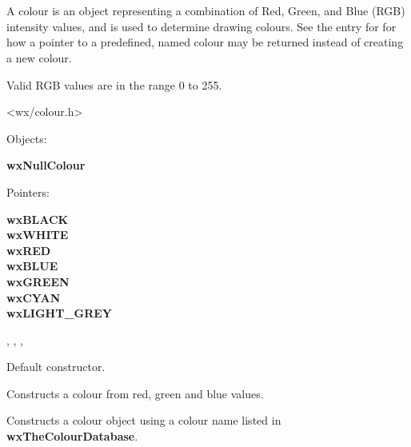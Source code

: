 \section{}\label{wxcolour}

A colour is an object representing a combination of Red, Green, and Blue (RGB) intensity values,
and is used to determine drawing colours. See the
entry for  for how a pointer to a predefined,
named colour may be returned instead of creating a new colour.

Valid RGB values are in the range 0 to 255.




<wx/colour.h>


Objects:

{\bf wxNullColour}

Pointers:

{\bf wxBLACK\\
wxWHITE\\
wxRED\\
wxBLUE\\
wxGREEN\\
wxCYAN\\
wxLIGHT\_GREY}


, , ,\rtfsp
{}


\label{wxcolourconstr}


Default constructor.


Constructs a colour from red, green and blue values.


Constructs a colour object using a colour name
listed in {\bf wxTheColourDatabase}.



